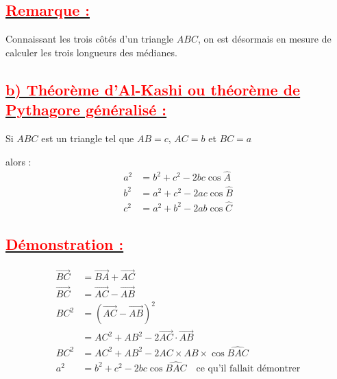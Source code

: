 \documentclass[12pt,a4paper]{article}
\begin{document}
\subsection*{\underline{\textbf{\textcolor{red}{Remarque :}}}}
Connaissant les trois côtés d'un triangle $ABC$, on est désormais en mesure de calculer les trois longueurs des médianes.

\subsection*{\underline{\textbf{\textcolor{red}{b) Théorème d'Al-Kashi ou théorème de Pythagore généralisé :}}}}

Si $ABC$ est un triangle tel que $AB = c$, $AC = b$ et $BC = a$

\vspace{0.5cm}

\begin{center}
\end{center}

\noindent alors :
\begin{align*}
a^2 &= b^2 + c^2 - 2bc \cos \widehat{A} \\
b^2 &= a^2 + c^2 - 2ac \cos \widehat{B} \\
c^2 &= a^2 + b^2 - 2ab \cos \widehat{C}
\end{align*}

\subsection*{\underline{\textbf{\textcolor{red}{Démonstration :}}}}

\begin{align*}
\overrightarrow{BC} &= \overrightarrow{BA} + \overrightarrow{AC} \\
\overrightarrow{BC} &= \overrightarrow{AC} - \overrightarrow{AB} \\
BC^2 &= (\overrightarrow{AC} - \overrightarrow{AB})^2 \\
&= AC^2 + AB^2 - 2\overrightarrow{AC} \cdot \overrightarrow{AB} \\
BC^2 &= AC^2 + AB^2 - 2 AC \times AB \times \cos \widehat{BAC} \\
a^2 &= b^2 + c^2 - 2bc \cos \widehat{BAC} \quad \text{ce qu'il fallait démontrer}
\end{align*}
\end{document}
